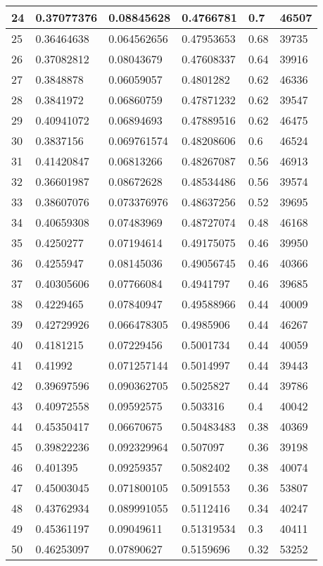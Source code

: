 \begin{longtable}{|l|l|l|l|l|l|}
24 & 0.37077376 & 0.08845628 & 0.4766781 & 0.7 & 46507 \\ \hline 
25 & 0.36464638 & 0.064562656 & 0.47953653 & 0.68 & 39735 \\ \hline 
26 & 0.37082812 & 0.08043679 & 0.47608337 & 0.64 & 39916 \\ \hline 
27 & 0.3848878 & 0.06059057 & 0.4801282 & 0.62 & 46336 \\ \hline 
28 & 0.3841972 & 0.06860759 & 0.47871232 & 0.62 & 39547 \\ \hline 
29 & 0.40941072 & 0.06894693 & 0.47889516 & 0.62 & 46475 \\ \hline 
30 & 0.3837156 & 0.069761574 & 0.48208606 & 0.6 & 46524 \\ \hline 
31 & 0.41420847 & 0.06813266 & 0.48267087 & 0.56 & 46913 \\ \hline 
32 & 0.36601987 & 0.08672628 & 0.48534486 & 0.56 & 39574 \\ \hline 
33 & 0.38607076 & 0.073376976 & 0.48637256 & 0.52 & 39695 \\ \hline 
34 & 0.40659308 & 0.07483969 & 0.48727074 & 0.48 & 46168 \\ \hline 
35 & 0.4250277 & 0.07194614 & 0.49175075 & 0.46 & 39950 \\ \hline 
36 & 0.4255947 & 0.08145036 & 0.49056745 & 0.46 & 40366 \\ \hline 
37 & 0.40305606 & 0.07766084 & 0.4941797 & 0.46 & 39685 \\ \hline 
38 & 0.4229465 & 0.07840947 & 0.49588966 & 0.44 & 40009 \\ \hline 
39 & 0.42729926 & 0.066478305 & 0.4985906 & 0.44 & 46267 \\ \hline 
40 & 0.4181215 & 0.07229456 & 0.5001734 & 0.44 & 40059 \\ \hline 
41 & 0.41992 & 0.071257144 & 0.5014997 & 0.44 & 39443 \\ \hline 
42 & 0.39697596 & 0.090362705 & 0.5025827 & 0.44 & 39786 \\ \hline 
43 & 0.40972558 & 0.09592575 & 0.503316 & 0.4 & 40042 \\ \hline 
44 & 0.45350417 & 0.06670675 & 0.50483483 & 0.38 & 40369 \\ \hline 
45 & 0.39822236 & 0.092329964 & 0.507097 & 0.36 & 39198 \\ \hline 
46 & 0.401395 & 0.09259357 & 0.5082402 & 0.38 & 40074 \\ \hline 
47 & 0.45003045 & 0.071800105 & 0.5091553 & 0.36 & 53807 \\ \hline 
48 & 0.43762934 & 0.089991055 & 0.5112416 & 0.34 & 40247 \\ \hline 
49 & 0.45361197 & 0.09049611 & 0.51319534 & 0.3 & 40411 \\ \hline 
50 & 0.46253097 & 0.07890627 & 0.5159696 & 0.32 & 53252 \\ \hline 
\end{longtable}
